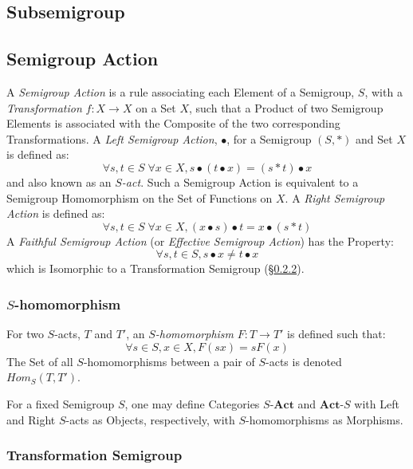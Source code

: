 \subsection{Subsemigroup}\label{sec:subsemigroup}

\subsection{Semigroup Action}\label{sec:semigroup_action}

A \emph{Semigroup Action} is a rule associating each Element of a
Semigroup, $S$, with a \emph{Transformation} $f : X \rightarrow X$ on
a Set $X$, such that a Product of two Semigroup Elements is associated
with the Composite of the two corresponding Transformations. A
\emph{Left Semigroup Action}, $\bullet$, for a Semigroup $(S,*)$ and
Set $X$ is defined as:
\[
  \forall s,t \in S\;\forall x \in X, s \bullet (t \bullet x) = (s * t)
  \bullet x
\]
and also known as an \emph{$S$-act}. Such a Semigroup Action is
equivalent to a Semigroup Homomorphism on the Set of Functions on $X$.
A \emph{Right Semigroup Action} is defined as:
\[
  \forall s,t \in S\;\forall x \in X, (x \bullet s) \bullet t = x
  \bullet (s * t)
\]
A \emph{Faithful Semigroup Action} (or \emph{Effective Semigroup
  Action}) has the Property:
\[
  \forall s, t \in S, s \bullet x \neq t \bullet x
\]
which is Isomorphic to a Transformation Semigroup
(\S\ref{sec:transformation_semigroup}).



\subsubsection{$S$-homomorphism}\label{sec:s_homomorphism}

For two $S$-acts, $T$ and $T'$, an \emph{$S$-homomorphism} $F : T
\rightarrow T'$ is defined such that:
\[
  \forall s \in S, x \in X, F(sx) = sF(x)
\]
The Set of all $S$-homomorphisms between a pair of $S$-acts is denoted
$Hom_S(T,T')$.

For a fixed Semigroup $S$, one may define Categories
$S\text{-}\mathbf{Act}$ and $\mathbf{Act}\text{-}S$ with Left and
Right $S$-acts as Objects, respectively, with $S$-homomorphisms as
Morphisms.



\subsubsection{Transformation Semigroup}\label{sec:transformation_semigroup}


